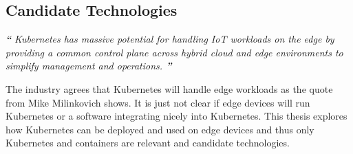 \subsection{Candidate Technologies} \label{sec:candidateTechnologies}

\begin{displayquote}
\textit{\textbf{\Huge{``}}}
\textit{\large{
Kubernetes has massive potential for handling IoT workloads on the edge by providing a common control plane across hybrid cloud and edge environments to simplify management and operations\cite{ioFogMainBlog:online}.
}}
\textit{\textbf{\Huge{''}}}
\\[1pt]
\end{displayquote}

The industry agrees that Kubernetes will handle edge workloads as the quote from Mike Milinkovich shows. It is just not clear if edge devices will run Kubernetes or a software integrating nicely into Kubernetes. This thesis explores how Kubernetes can be deployed and used on edge devices and thus only Kubernetes and containers are relevant and candidate technologies.



